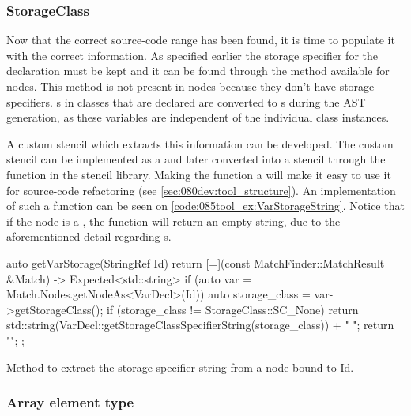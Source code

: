 \subsubsection*{StorageClass}
Now that the correct source-code range has been found, it is time to populate it with the correct information. As specified earlier the storage specifier for the declaration must be kept and it can be found through the  method available for  nodes. This method is not present in  nodes because they don't have storage specifiers.
s in classes that are declared  are converted to s during the AST generation, as these variables are independent of the individual class instances. 

A custom stencil which extracts this information can be developed. The custom  stencil can be implemented as a  and later converted into a stencil through the  function in the stencil library. Making the function a  will make it easy to use it for source-code refactoring (see \cref{sec:080dev:tool_structure}). An implementation of such a function can be seen on \cref{code:085tool_ex:VarStorageString}.
Notice that if the node is a , the function will return an empty string, due to the aforementioned detail regarding  s.

\begin{listing}[H]
    \begin{cppcode}
auto getVarStorage(StringRef Id) {
    return [=](const MatchFinder::MatchResult &Match) -> Expected<std::string> {
        if (auto var = Match.Nodes.getNodeAs<VarDecl>(Id)) {
            auto storage_class = var->getStorageClass();
            if (storage_class != StorageClass::SC_None) {
               return std::string(VarDecl::getStorageClassSpecifierString(storage_class)) + " ";
            }
        }
        return "";
    };
}
    \end{cppcode}
    \caption{Method to extract the storage specifier string from a  node bound to Id.}
    \label{code:085tool_ex:VarStorageString}
\end{listing}

\subsubsection*{Array element type}

